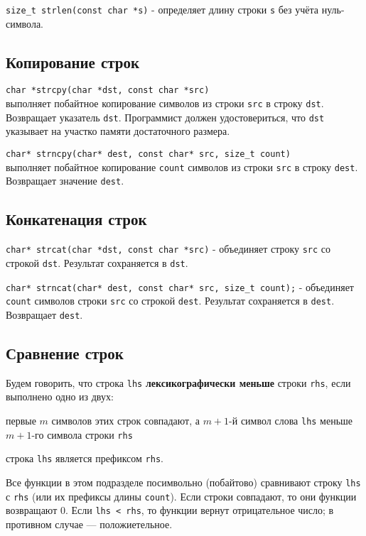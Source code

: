 \verb|size_t strlen(const char *s)| - определяет длину строки \verb|s| без учёта нуль-символа.

\subsection*{Копирование строк}

\verb|char *strcpy(char *dst, const char *src)|\\
выполняет побайтное копирование символов из строки \verb|src|
в строку \verb|dst|. Возвращает указатель \verb|dst|. Программист должен удостовериться, что \verb|dst| указывает
на участко памяти достаточного размера.

\verb|char* strncpy(char* dest, const char* src, size_t count)|\\
выполняет побайтное копирование \verb|count| символов из строки \verb|src| в строку \verb|dest|. Возвращает значение
\verb|dest|.

\subsection*{Конкатенация строк}
\verb|char* strcat(char *dst, const char *src)| - объединяет строку \verb|src| со строкой \verb|dst|.
Результат сохраняется в \verb|dst|. 

\verb|char* strncat(char* dest, const char* src, size_t count);| - объединяет \verb|count|
символов строки \verb|src| со строкой \verb|dest|. Результат сохраняется в \verb|dest|.
Возвращает \verb|dest|.

\subsection*{Сравнение строк}
Будем говорить, что строка \verb|lhs| \textbf{лексикографически меньше} \label{def:lex_cmp}
строки \verb|rhs|, если выполнено одно из двух:
\begin{enuminl}
  \item первые $m$ символов этих строк совпадают, а $m+1$-й символ слова \verb|lhs| меньше $m+1$-го символа
  строки \verb|rhs| \enspace
  \item строка \verb|lhs| является префиксом \verb|rhs|.
\end{enuminl}

Все функции в этом подразделе посимвольно (побайтово) сравнивают строку \verb|lhs|
с \verb|rhs| (или их префиксы длины \verb|count|). Если строки совпадают, то они
функции возвращают 0. Если \verb|lhs < rhs|, то функции вернут отрицательное число;
в противном случае --- положиетельное.

